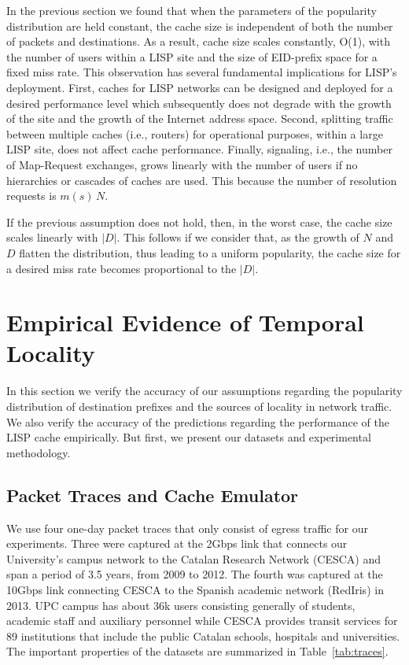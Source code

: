\documentclass[twocolumn, 10pt]{article}
\theoremstyle{plain}
\begin{document}
In the previous section we found that when the parameters of the popularity
distribution are held constant, the cache size is independent of both the
number of packets and destinations. As a result, cache size scales constantly,
O(1), with the number of users within a LISP site and the size of EID-prefix space
for a fixed miss rate. This observation has several fundamental implications
for LISP's deployment. First, caches for LISP networks can be designed and
deployed for a desired performance level which subsequently does not degrade
with the growth of the site and the growth of the Internet address space.
Second, splitting traffic between multiple caches (i.e., routers) for
operational purposes, within a large LISP site, does not affect cache
performance.  Finally, signaling, i.e., the number of Map-Request exchanges,
grows linearly with the number of users if no hierarchies or cascades of
caches are used. This because the number of resolution requests is $m(s)\,N$.


If the previous assumption does not hold, then, in the worst case, the cache
size scales linearly with $|D|$. This follows if we consider that, as the
growth of $N$ and $D$ flatten the distribution, thus leading to a uniform
popularity, the cache size for a desired miss rate becomes proportional to the
$|D|$. 


  
\section{Empirical Evidence of Temporal Locality}\label{sec:evaluation}
In this section we verify the accuracy of our assumptions regarding the
popularity distribution of destination prefixes and the sources of locality in
network traffic. We also verify the accuracy of the predictions regarding the
performance of the LISP cache empirically. But first, we present our datasets
and experimental methodology.

\subsection{Packet Traces and Cache Emulator}

We use four one-day packet traces that only consist of egress traffic for our
experiments. Three were captured at the 2Gbps link that connects our
University's campus network to the Catalan Research Network (CESCA) and span a
period of 3.5 years, from 2009 to 2012. The fourth was captured at the 10Gbps
link connecting CESCA to the Spanish academic network (RedIris) in 2013. UPC
campus has about 36k users consisting generally of students, academic staff
and auxiliary personnel while CESCA provides transit services for 89
institutions that include the public Catalan schools, hospitals and
universities. 
The important properties of the datasets are summarized in
Table~\ref{tab:traces}. 
\end{document}
